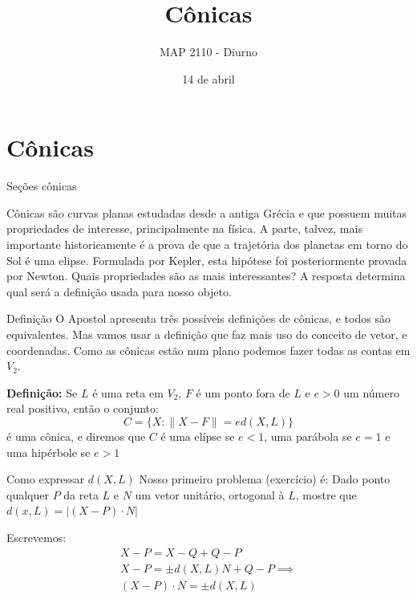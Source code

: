 \documentclass{beamer}
\title[Conicas]{Cônicas}
\author{MAP 2110 - Diurno}
\institute{IME USP}
\date{14 de abril}
\begin{document}
\begin{frame}
  \titlepage
\end{frame}



\section{Cônicas}

\begin{frame}{Seções cônicas}

  Cônicas são curvas planas estudadas desde a antiga Grécia e que possuem muitas
  propriedades de interesse, principalmente na física. A parte, talvez, mais 
  importante historicamente é a prova de que a trajetória dos planetas em torno do 
  Sol é uma elipse. Formulada por Kepler, esta hipótese foi posteriormente provada
  por Newton. Quais propriedades são as mais interessantes? A resposta determina 
  qual será a definição usada para nosso objeto.

  
\end{frame}

\begin{frame}{Definição}
  O Apostol apresenta três possíveis definições de cônicas, e todos são equivalentes.
  Mas vamos usar a definição que faz mais uso do conceito de vetor, e coordenadas.
  Como as cônicas estão num plano podemos fazer todas as contas em $V_2$.

  \textbf{Definição:} Se $L$ é uma reta em $V_2$, $F$ é um ponto fora de $L$ e $e>0$ um 
  número real positivo, então o conjunto:
  $$ C=\{X : \|X-F\| = e d(X,L)    \}$$ é uma cônica, e diremos que $C$ é uma elípse se 
  $e<1$, uma parábola se $e=1$ e uma hipérbole se $e>1$


\end{frame}

\begin{frame}{Como expressar $d(X,L)$}
 Nosso primeiro problema (exercício) é: Dado ponto qualquer $P$ da reta $L$ e 
 $N$ um vetor unitário, ortogonal à $L$, mostre que $d(x,L)=|(X-P)\cdot N|$
\end{frame} 

\begin{frame}

  Escrevemos:
  \begin{gather*}
    X-P = X-Q + Q-P \\
    X-P = \pm d(X,L)N+ Q-P \implies \\
    (X-P)\cdot N = \pm d(X,L) 
  \end{gather*}
\end{frame}
\end{document}
